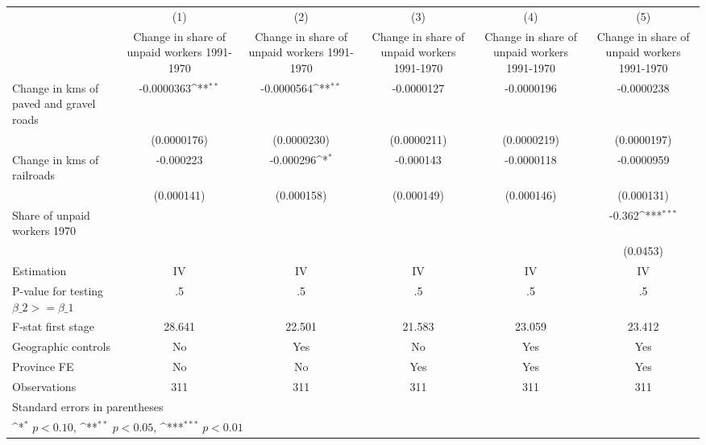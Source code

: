 {
\def\sym#1{\ifmmode^{#1}\else\(^{#1}\)\fi}
\begin{tabular}{l*{5}{c}}
\hline\hline
                    &\multicolumn{1}{c}{(1)}&\multicolumn{1}{c}{(2)}&\multicolumn{1}{c}{(3)}&\multicolumn{1}{c}{(4)}&\multicolumn{1}{c}{(5)}\\
                    &\multicolumn{1}{c}{Change in share of unpaid workers 1991-1970}&\multicolumn{1}{c}{Change in share of unpaid workers 1991-1970}&\multicolumn{1}{c}{Change in share of unpaid workers 1991-1970}&\multicolumn{1}{c}{Change in share of unpaid workers 1991-1970}&\multicolumn{1}{c}{Change in share of unpaid workers 1991-1970}\\
\hline
Change in kms of paved and gravel roads&  -0.0000363\sym{**} &  -0.0000564\sym{**} &  -0.0000127         &  -0.0000196         &  -0.0000238         \\
                    & (0.0000176)         & (0.0000230)         & (0.0000211)         & (0.0000219)         & (0.0000197)         \\
[1em]
Change in kms of railroads&   -0.000223         &   -0.000296\sym{*}  &   -0.000143         &  -0.0000118         &  -0.0000959         \\
                    &  (0.000141)         &  (0.000158)         &  (0.000149)         &  (0.000146)         &  (0.000131)         \\
[1em]
Share of unpaid workers 1970&                     &                     &                     &                     &      -0.362\sym{***}\\
                    &                     &                     &                     &                     &    (0.0453)         \\
\hline
Estimation          &          IV         &          IV         &          IV         &          IV         &          IV         \\
P-value for testing $\beta\_2 >= \beta\_1$&          .5         &          .5         &          .5         &          .5         &          .5         \\
F-stat first stage  &      28.641         &      22.501         &      21.583         &      23.059         &      23.412         \\
Geographic controls &          No         &         Yes         &          No         &         Yes         &         Yes         \\
Province FE         &          No         &          No         &         Yes         &         Yes         &         Yes         \\
Observations        &         311         &         311         &         311         &         311         &         311         \\
\hline\hline
\multicolumn{6}{l}{\footnotesize Standard errors in parentheses}\\
\multicolumn{6}{l}{\footnotesize \sym{*} \(p<0.10\), \sym{**} \(p<0.05\), \sym{***} \(p<0.01\)}\\
\end{tabular}
}
